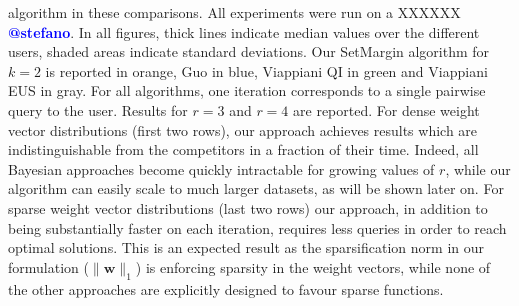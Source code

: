 \documentclass{article}
\renewcommand\[{\begin{equation}}
\renewcommand\]{\end{equation}}
\newcommand{\vecvar}[1]{\ensuremath{\boldsymbol{#1}}}
\newcommand{\vw}{\vecvar{w}}
\newcommand{\andrea}[1]{{\bf \textcolor{blue}{{\fbox{Andrea:} #1}}}}
\newcommand{\stefano}[1]{{\bf \textcolor{green}{{\fbox{Stefano:} #1}}}}
\begin{document}
algorithm in these comparisons. All experiments were run on a XXXXXX\andrea{@stefano}.
In all figures, thick lines indicate median values over the different
users, shaded areas indicate standard deviations. Our {\sc SetMargin}
algorithm for $k=2$ is reported in orange, Guo in blue, Viappiani QI
in green and Viappiani EUS in gray. For all algorithms, one iteration
corresponds to a single pairwise query to the user.  Results for $r=3$
and $r=4$ are reported.  For dense weight vector distributions (first
two rows), our approach achieves results which are indistinguishable
from the competitors in a fraction of their time.  Indeed, all
Bayesian approaches become quickly intractable for growing values of $r$,
while our algorithm can easily scale to much larger datasets, as will
be shown later on. For sparse weight vector distributions (last two
rows) our approach, in addition to being substantially faster on each
iteration, requires less queries in order to reach optimal
solutions. This is an expected result as the sparsification norm in
our formulation ($\| \vw \|_1$) is enforcing sparsity in the weight
vectors, while none of the other approaches are explicitly designed to
favour sparse functions.



\end{document}
